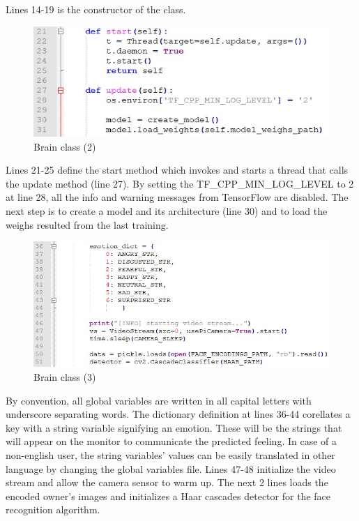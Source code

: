 \documentclass[runningheads,a4paper,12pt]{report}
\begin{document}
Lines 14-19 is the constructor of the class. 

\begin{figure}[h]
	\centering
	\includegraphics[width=0.7\linewidth]{./images/3_brain2}\hfill	
	\caption{Brain class (2)}  
    \label{fig:3_brain2}
\end{figure}

Lines 21-25 define the start method which invokes  and starts a thread that calls the update method (line 27). By setting the TF\_CPP\_MIN\_LOG\_LEVEL to 2 at line 28, all the info and warning messages from TensorFlow are disabled. The next step is to create a model and its architecture (line 30) and to load the weighs resulted from the last training.

\begin{figure}[h]
	\centering
	\includegraphics[width=\linewidth]{./images/3_brain3}\hfill	
	\caption{Brain class (3)}  
    \label{fig:3_brain3}
\end{figure}

By convention, all global variables are written in all capital letters with underscore separating words. The dictionary definition at lines 36-44 corellates a key with a string variable signifying an emotion. These will be the strings that will appear on the monitor to communicate the predicted feeling. In case of a non-english user, the string variables' values can be easily translated in other language by changing the global variables file. Lines 47-48 initialize the video stream and allow the camera sensor to warm up. The next 2 lines loads the encoded owner's images and initializes a Haar cascades detector for the face recognition algorithm. 
\end{document}

